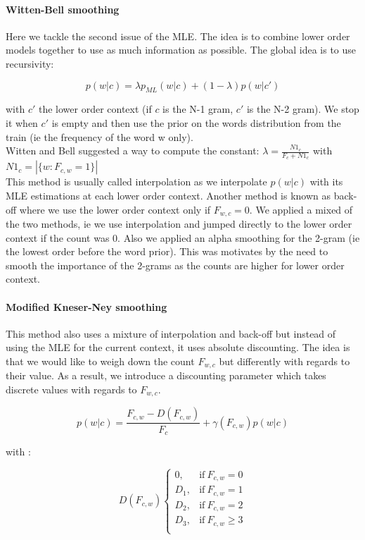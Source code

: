 \documentclass[11pt]{article}
\begin{document}
\paragraph{Witten-Bell smoothing}

Here we tackle the second issue of the MLE. The idea is to combine lower order models together to use as much information as possible. The global idea is to use recursivity: 

\[
	p(w|c) = \lambda p_{ML}(w|c) + (1 - \lambda)p(w|c')
\]

\noindent with $c'$ the lower order context (if $c$ is the N-1 gram, $c'$ is the N-2 gram). We stop it when $c'$ is empty and then use the prior on the words distribution from the train (ie the frequency of the word w only). \\

\noindent Witten and Bell suggested a way to compute the constant: $\lambda = \frac{N1_c}{F_c + N1_c}$ with $N1_c = |\{w: F_{c, w} = 1\}|$\\

\noindent This method is usually called interpolation as we interpolate $p(w|c)$ with its MLE estimations at each lower order context. Another method is known as back-off where we use the lower order context only if $F_{w,c} = 0$. We applied a mixed of the two methods, ie we use interpolation and jumped directly to the lower order context if the count was 0. Also we applied an alpha smoothing for the 2-gram (ie the lowest order before the word prior). This was motivates by the need to smooth the importance of the 2-grams as the counts are higher for lower order context.

\paragraph{Modified Kneser-Ney smoothing}

This method also uses a mixture of interpolation and back-off but instead of using the MLE for the current context, it uses absolute discounting. The idea is that we would like to weigh down the count $F_{w,c}$ but differently with regards to their value. As a result, we introduce a discounting parameter which takes discrete values with regards to $F_{w,c}$.

\[
	p(w|c) = \frac{F_{c,w} - D(F_{c,w})}{F_c} + \gamma(F_{c,w}) p(w|c)
\]

with :

\[
D(F_{c,w})
    \begin{cases}
      0, & \text{if}\ F_{c,w}=0 \\
      D_1, & \text{if}\ F_{c,w}=1 \\
      D_2, & \text{if}\ F_{c,w}=2 \\
      D_3, & \text{if}\ F_{c,w} \geq 3 \\
    \end{cases}
\]
\end{document}
